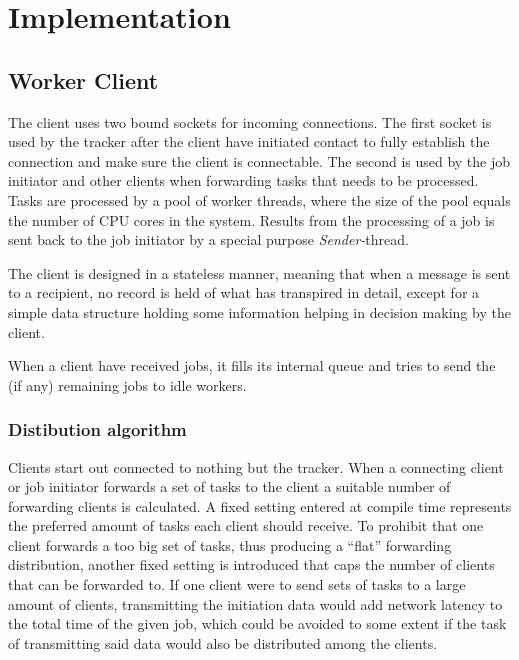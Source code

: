 \chapter{Implementation}

\section{Worker Client}
The client uses two bound sockets for incoming connections. The first socket is
used by the tracker after the client have initiated contact to fully establish
the connection and make sure the client is connectable. The second is used by
the job initiator and other clients when forwarding tasks that needs to be
processed. Tasks are processed by a pool of worker threads, where the size of
the pool equals the number of CPU cores in the system. Results from the
processing of a job is sent back to the job initiator by a special purpose 
\textit{Sender-}thread.

The client is designed in a stateless manner, meaning that when a message is
sent to a recipient, no record is held of what has transpired in detail, except
for a simple data structure holding some information helping in decision making
by the client.



When a client have received jobs, it fills its internal queue and
tries to send the (if any) remaining jobs to idle workers.

\subsection{Distibution algorithm}
Clients start out connected to nothing but the tracker. When a connecting client
or job initiator forwards a set of tasks to the client a suitable number of
forwarding clients is calculated. A fixed setting entered at compile time represents
the preferred amount of tasks each client should receive. To prohibit that one
client forwards a too big set of tasks, thus producing a ``flat'' forwarding
distribution, another fixed setting is introduced that caps the number of
clients that can be forwarded to. If one client were to send sets of tasks to a
large amount of clients, transmitting the initiation data would add network
latency to the total time of the given job, which could be avoided to some
extent if the task of transmitting said data would also be distributed among the
clients.

